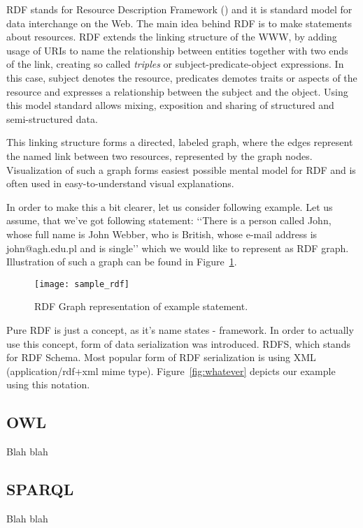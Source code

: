 RDF stands for Resource Description Framework (\cite{rdfPrimer:2004}) and it is standard
model for data interchange on the Web. The main idea behind RDF is to make statements about resources. RDF extends the linking structure of the WWW, by adding usage of URIs to name the relationship between entities together with two ends of the link, creating so called \emph{triples} or subject-predicate-object expressions. In this case, subject denotes the resource, predicates demotes traits or aspects of the resource and expresses a relationship between the subject and the object. Using this model standard allows mixing, exposition and sharing of structured and semi-structured data.

This linking structure forms a directed, labeled graph, where the edges represent the named link between
two resources, represented by the graph nodes. Visualization of such a graph forms easiest possible mental model for RDF and is often used in easy-to-understand visual explanations.

In order to make this a bit clearer, let us consider following example. Let us assume, that we\rq{}ve got following statement: \lq\lq{}There is a person called John, whose full name is John Webber, who is British, whose e-mail address is john@agh.edu.pl and is single\rq\rq{} which we would like to represent as RDF graph. Illustration of such a graph can be found in Figure~\ref{fig:sample_rdf}.

\begin{figure}[ht]
  \centering
  \texttt{[image: sample\_rdf]}
  \caption{RDF Graph representation of example statement.}
  \label{fig:sample_rdf}
\end{figure}

Pure RDF is just a concept, as it\rq{}s name states - framework. In order to actually use this concept, form of data serialization was introduced. RDFS, which stands for RDF Schema\cite{rdfRef:2004}. Most popular form of RDF serialization is using XML (application/rdf+xml mime type). Figure~\ref{fig:whatever} depicts our example using this notation.


\subsection{OWL}

Blah blah\cite{owlRef:2009, owlPrimer:2009}

\subsection{SPARQL}
Blah blah\cite{rdf-sparql-query:2008}
